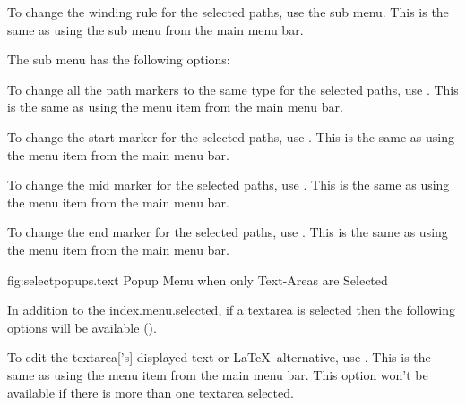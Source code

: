 To change the winding rule for the selected paths,
use the  sub menu. This is the same as using the
 sub menu from the main menu bar.


The  sub menu has the following options:


To change all the path markers to the same type for the selected paths,
use . This is the same as using the
 menu item from the main menu bar.


To change the start marker for the selected paths,
use . This is the same as using the
 menu item from the main menu bar.


To change the mid marker for the selected paths,
use . This is the same as using the
 menu item from the main menu bar.


To change the end marker for the selected paths,
use . This is the same as using the
 menu item from the main menu bar.




\FloatFig
  {fig:selectpopups.text}
  {}
  {Popup Menu when only Text-Areas are Selected}

In addition to the \gls{index.menu.selected},
if a \gls{textarea} is selected then the following options will be available
().


To edit the \gls{textarea}['s] displayed text or \LaTeX\
alternative, use . This is the same as using
the \menu{edit.textarea.edit} menu item from the main menu bar.
This option won't be available if there is more than one
\gls{textarea} selected.


